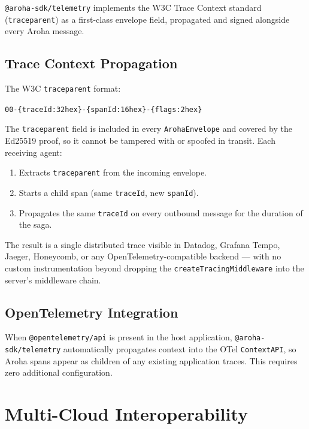 \documentclass[11pt,a4paper]{article}
\begin{document}
\texttt{@aroha-sdk/telemetry} implements the W3C Trace Context standard
(\texttt{traceparent}) as a first-class envelope field, propagated and signed
alongside every Aroha message.

\subsection{Trace Context Propagation}

The W3C \texttt{traceparent} format:
\begin{center}
  \texttt{00-\{traceId:32hex\}-\{spanId:16hex\}-\{flags:2hex\}}
\end{center}

The \texttt{traceparent} field is included in every \texttt{ArohaEnvelope} and
covered by the Ed25519 proof, so it cannot be tampered with or spoofed in transit.
Each receiving agent:
\begin{enumerate}[noitemsep]
  \item Extracts \texttt{traceparent} from the incoming envelope.
  \item Starts a child span (same \texttt{traceId}, new \texttt{spanId}).
  \item Propagates the same \texttt{traceId} on every outbound message for
        the duration of the saga.
\end{enumerate}

The result is a single distributed trace visible in Datadog, Grafana Tempo,
Jaeger, Honeycomb, or any OpenTelemetry-compatible backend --- with no custom
instrumentation beyond dropping the \texttt{createTracingMiddleware} into the
server's middleware chain.

\subsection{OpenTelemetry Integration}

When \texttt{@opentelemetry/api} is present in the host application,
\texttt{@aroha-sdk/telemetry} automatically propagates context into the OTel
\texttt{ContextAPI}, so Aroha spans appear as children of any existing application
traces. This requires zero additional configuration.

\section{Multi-Cloud Interoperability}
\end{document}
